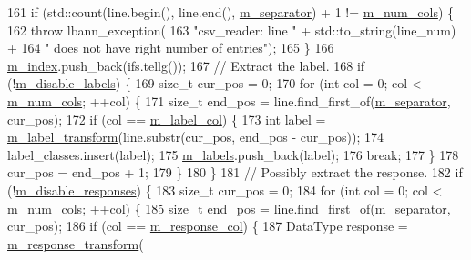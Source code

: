 \begin{DoxyCode}
161     \textcolor{keywordflow}{if} (std::count(line.begin(), line.end(), \hyperlink{classlbann_1_1csv__reader_abab4a731daa751856f083c117ac8862a}{m\_separator}) + 1 != 
      \hyperlink{classlbann_1_1csv__reader_a7607d3f6b356538671147a0b8f7b09c8}{m\_num\_cols}) \{
162       \textcolor{keywordflow}{throw} lbann\_exception(
163         \textcolor{stringliteral}{"csv\_reader: line "} + std::to\_string(line\_num) +
164         \textcolor{stringliteral}{" does not have right number of entries"});
165     \}
166     \hyperlink{classlbann_1_1csv__reader_a2a959e7839d2d11e2deba98ba1884006}{m\_index}.push\_back(ifs.tellg());
167     \textcolor{comment}{// Extract the label.}
168     \textcolor{keywordflow}{if} (!\hyperlink{classlbann_1_1csv__reader_a5f013485fc1466dcf1f78ef020b845d4}{m\_disable\_labels}) \{
169       \textcolor{keywordtype}{size\_t} cur\_pos = 0;
170       \textcolor{keywordflow}{for} (\textcolor{keywordtype}{int} col = 0; col < \hyperlink{classlbann_1_1csv__reader_a7607d3f6b356538671147a0b8f7b09c8}{m\_num\_cols}; ++col) \{
171         \textcolor{keywordtype}{size\_t} end\_pos = line.find\_first\_of(\hyperlink{classlbann_1_1csv__reader_abab4a731daa751856f083c117ac8862a}{m\_separator}, cur\_pos);
172         \textcolor{keywordflow}{if} (col == \hyperlink{classlbann_1_1csv__reader_acc02e56c81421c4507f7178ca8461b04}{m\_label\_col}) \{
173           \textcolor{keywordtype}{int} label = \hyperlink{classlbann_1_1csv__reader_aa9b671a172828980cb9c91180c3d0ad8}{m\_label\_transform}(line.substr(cur\_pos, end\_pos - cur\_pos));
174           label\_classes.insert(label);
175           \hyperlink{classlbann_1_1csv__reader_a1f11d02df556a4ec638f332ccfc03eb2}{m\_labels}.push\_back(label);
176           \textcolor{keywordflow}{break};
177         \}
178         cur\_pos = end\_pos + 1;
179       \}
180     \}
181     \textcolor{comment}{// Possibly extract the response.}
182     \textcolor{keywordflow}{if} (!\hyperlink{classlbann_1_1csv__reader_a1e133c3585df5f131b4772f618e77ad2}{m\_disable\_responses}) \{
183       \textcolor{keywordtype}{size\_t} cur\_pos = 0;
184       \textcolor{keywordflow}{for} (\textcolor{keywordtype}{int} col = 0; col < \hyperlink{classlbann_1_1csv__reader_a7607d3f6b356538671147a0b8f7b09c8}{m\_num\_cols}; ++col) \{
185         \textcolor{keywordtype}{size\_t} end\_pos = line.find\_first\_of(\hyperlink{classlbann_1_1csv__reader_abab4a731daa751856f083c117ac8862a}{m\_separator}, cur\_pos);
186         \textcolor{keywordflow}{if} (col == \hyperlink{classlbann_1_1csv__reader_a1cfa3562ecd0a7f6358290f299de5812}{m\_response\_col}) \{
187           DataType response = \hyperlink{classlbann_1_1csv__reader_a161c3606668efbc8910cad2f7fa01ed3}{m\_response\_transform}(

\end{DoxyCode}
